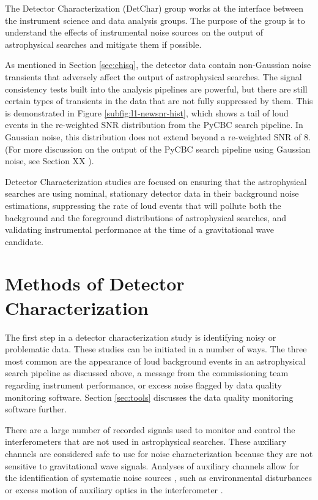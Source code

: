 The Detector Characterization (DetChar) group works at the interface 
between the instrument science and data analysis groups. 
The purpose of 
the group is to understand the effects of instrumental noise sources on 
the output of astrophysical searches and mitigate them if possible.

As mentioned in Section \ref{sec:chisq}, the detector data contain 
non-Gaussian noise transients that adversely affect the output of 
astrophysical searches. The signal consistency tests built into the 
analysis pipelines are powerful, but there are still 
certain types of transients in the data that are not fully suppressed 
by them. This is demonstrated in Figure \ref{subfig:l1-newsnr-hist}, which shows a 
tail of loud events in the re-weighted SNR distribution from the PyCBC 
search pipeline. In Gaussian noise, this distribution does not extend beyond 
a re-weighted SNR of 8. (For more discussion on the output of the PyCBC search 
pipeline using Gaussian noise, see Section XX ).

Detector Characterization studies are focused on ensuring that the
astrophysical searches are using nominal, stationary
detector data in their background noise estimations, suppressing the 
rate of loud events that will pollute both the background and the foreground 
distributions of astrophysical searches, and validating instrumental 
performance at the time of a gravitational wave candidate.

\section{Methods of Detector Characterization}

The first step in a detector characterization study is identifying 
noisy or problematic data. These studies can be initiated in a number of ways. 
The three most common are the appearance of 
loud background events in an astrophysical search pipeline as discussed above, 
a message from 
the commissioning team regarding instrument performance, or excess noise 
flagged by data quality monitoring software. Section \ref{sec:tools} discusses 
the data quality monitoring software further.

There are a large number of recorded signals used to monitor and control the
interferometers that are not used in astrophysical searches. These auxiliary
channels are considered safe to use for noise characterization because they are
not sensitive to gravitational wave signals. Analyses of auxiliary channels
allow for the identification of systematic noise sources \cite{Smith:2011,Isogai:2010},
such as environmental
disturbances \cite{Effler:2014zpa} or excess motion of auxiliary optics in the
interferometer \cite{GW150914-DETECTORS,InstrumentNoisePaper}. 

